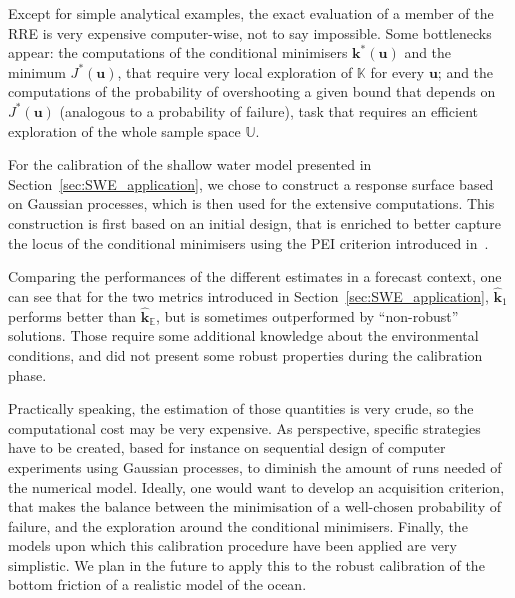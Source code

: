 \documentclass[preprint, review, 1p]{elsarticle}
\newcommand{\Ex}{\mathbb{E}}
\newcommand{\hatkmean}{\hat{\mathbf{k}}_{\Ex}}
\newcommand{\kest}{\hat{\mathbf{k}}}
\newcommand{\RRE}{RRE}
\newcommand{\Kspace}{\mathbb{K}}
\newcommand{\Uspace}{\mathbb{U}}
\newcommand{\victor}[1]{{\itshape\color{green} ({#1})}}
\begin{document}
Except for simple analytical examples, the exact evaluation of a member of the \RRE{} is very expensive computer-wise, not to say impossible. Some bottlenecks appear: the computations of the conditional minimisers $\mathbf{k}^*(\mathbf{u})$ and the minimum $J^*(\mathbf{u})$, that require very local exploration of $\Kspace$ for every $\mathbf{u}$; and the computations of the probability of overshooting a given bound that depends on $J^*(\mathbf{u})$ (analogous to a probability of failure), task that requires an efficient exploration of the whole sample space $\Uspace$.

For the calibration of the shallow water model presented in Section~\ref{sec:SWE_application}, we chose to construct a response surface based on Gaussian processes, which is then used for the extensive computations. This construction is first based on an initial design, that is enriched to better capture the locus of the conditional minimisers using the PEI criterion introduced in~\cite{ginsbourger_bayesian_2014}. 

Comparing the performances of the different estimates in a forecast context, one can see that for the two metrics introduced in Section~\ref{sec:SWE_application}, $\kest_1$ performs better than $\hatkmean$, but is sometimes outperformed by ``non-robust'' solutions. Those require some additional knowledge about the environmental conditions, and did not present some robust properties during the calibration phase.

Practically speaking, the estimation of those quantities is very crude, so the computational cost may be very expensive. As perspective, specific strategies have to be created, based for instance on sequential design of computer experiments using Gaussian processes, to diminish the amount of runs needed of the numerical model. Ideally, one would want to develop an acquisition criterion, that makes the balance between the minimisation of a well-chosen probability of failure, and the exploration around the conditional minimisers.
Finally, the models upon which this calibration procedure have been applied are very simplistic. We plan in the future to apply this to the robust calibration of the bottom friction of a realistic model of the ocean.

\end{document}
